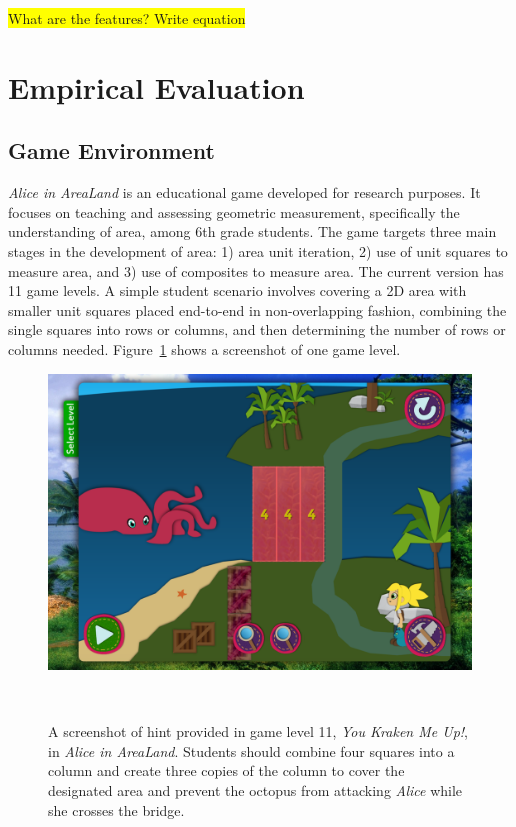 \documentclass{sigchi}
\newcommand{\hl}[1]{\colorbox{yellow}{#1}}
\begin{document}
\hl{What are the features? Write equation}

\section{Empirical Evaluation}

\subsection{Game Environment}
\textit {Alice in AreaLand} is an educational game developed for research purposes. It focuses on teaching and assessing geometric measurement, specifically the understanding of area, among 6th grade students. The game targets three main stages in the development of area: 1) area unit iteration, 2) use of unit squares to measure area, and 3) use of composites to measure area. The current version has 11 game levels. A simple student scenario involves covering a 2D area with smaller unit squares placed end-to-end in non-overlapping fashion, combining the single squares into rows or columns, and then determining the number of rows or columns needed. Figure~\ref{fig:figurekracken} shows a screenshot of one game level.

\begin{figure}
	\centering
	\includegraphics[width=0.9\columnwidth]{figures/kracken}
	\caption{A screenshot of hint provided in game level 11, \textit {You Kraken Me Up!}, in \textit {Alice in AreaLand}. Students should combine four squares into a column and create three copies of the column to cover the designated area and prevent the octopus from attacking \textit {Alice} while she crosses the bridge.}~\label{fig:figurekracken}
\end{figure}
\end{document}
